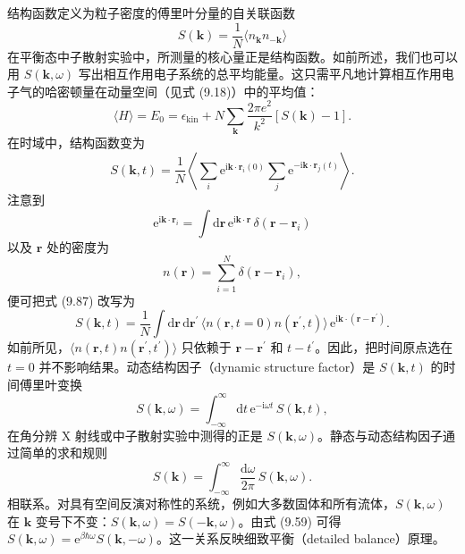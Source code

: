 结构函数定义为粒子密度的傅里叶分量的自关联函数
\begin{equation*}
S(\mathbf{k})=\frac{1}{N}\langle n_{\mathbf{k}}n_{-\mathbf{k}}\rangle\tag{9.85}
\end{equation*}
在平衡态中子散射实验中，所测量的核心量正是结构函数。如前所述，我们也可以用 $S(\mathbf{k},\omega)$ 写出相互作用电子系统的总平均能量。这只需平凡地计算相互作用电子气的哈密顿量在动量空间（见式 (9.18)）中的平均值：
\begin{equation*}
\langle H\rangle=E_0=\epsilon_{\mathrm{kin}}+N\sum_{\mathbf{k}}\frac{2\pi e^2}{k^2}\left[S(\mathbf{k})-1\right].\tag{9.86}
\end{equation*}
在时域中，结构函数变为
\begin{equation*}
S(\mathbf{k},t)=\frac{1}{N}\left\langle\sum_i\mathrm{e}^{\mathrm{i}\mathbf{k}\cdot\mathbf{r}_i(0)}\sum_j\mathrm{e}^{-\mathrm{i}\mathbf{k}\cdot\mathbf{r}_j(t)}\right\rangle.\tag{9.87}
\end{equation*}
注意到
\begin{equation*}
\mathrm{e}^{\mathrm{i}\mathbf{k}\cdot\mathbf{r}_i}=\int\mathrm{d}\mathbf{r}\,\mathrm{e}^{\mathrm{i}\mathbf{k}\cdot\mathbf{r}}\,\delta(\mathbf{r}-\mathbf{r}_i)\tag{9.88}
\end{equation*}
以及 $\mathbf{r}$ 处的密度为
\begin{equation*}
n(\mathbf{r})=\sum_{i=1}^{N}\delta(\mathbf{r}-\mathbf{r}_i),\tag{9.89}
\end{equation*}
便可把式 (9.87) 改写为
\begin{equation*}
S(\mathbf{k},t)=\frac{1}{N}\int\mathrm{d}\mathbf{r}\,\mathrm{d}\mathbf{r}^{\prime}\,\langle n(\mathbf{r},t=0)n(\mathbf{r}^{\prime},t)\rangle\,\mathrm{e}^{\mathrm{i}\mathbf{k}\cdot(\mathbf{r}-\mathbf{r}^{\prime})}.\tag{9.90}
\end{equation*}
如前所见，$\langle n(\mathbf{r},t)n(\mathbf{r}^{\prime},t^{\prime})\rangle$ 只依赖于 $\mathbf{r}-\mathbf{r}^{\prime}$ 和 $t-t^{\prime}$。因此，把时间原点选在 $t=0$ 并不影响结果。动态结构因子（dynamic structure factor）是 $S(\mathbf{k},t)$ 的时间傅里叶变换
\begin{equation*}
S(\mathbf{k},\omega)=\int_{-\infty}^{\infty}\mathrm{d}t\,\mathrm{e}^{-\mathrm{i}\omega t}\,S(\mathbf{k},t),\tag{9.91}
\end{equation*}
在角分辨 X 射线或中子散射实验中测得的正是 $S(\mathbf{k},\omega)$。静态与动态结构因子通过简单的求和规则
\begin{equation*}
S(\mathbf{k})=\int_{-\infty}^{\infty}\frac{\mathrm{d}\omega}{2\pi}\,S(\mathbf{k},\omega).\tag{9.92}
\end{equation*}
相联系。对具有空间反演对称性的系统，例如大多数固体和所有流体，$S(\mathbf{k},\omega)$ 在 $\mathbf{k}$ 变号下不变：$S(\mathbf{k},\omega)=S(-\mathbf{k},\omega)$。由式 (9.59) 可得 $S(\mathbf{k},\omega)=\mathrm{e}^{\beta\hbar\omega}S(\mathbf{k},-\omega)$。这一关系反映细致平衡（detailed balance）原理。

